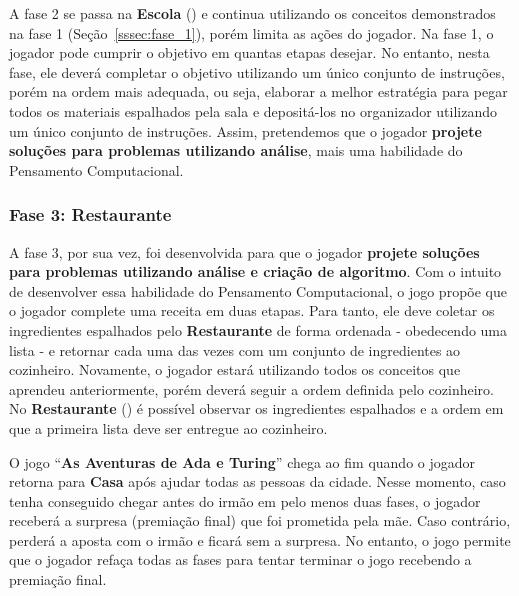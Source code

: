 A fase 2 se passa na \textbf{Escola} () e continua utilizando os conceitos demonstrados na fase 1 (Seção~\ref{sssec:fase_1}), porém limita as ações do jogador. Na fase 1, o jogador pode cumprir o objetivo em quantas etapas desejar. No entanto, nesta fase, ele deverá completar o objetivo utilizando um único conjunto de instruções, porém na ordem mais adequada, ou seja, elaborar a melhor estratégia para pegar todos os materiais espalhados pela sala e depositá-los no organizador utilizando um único conjunto de instruções. Assim, pretendemos que o jogador \textbf{projete soluções para problemas utilizando análise}, mais uma habilidade do Pensamento Computacional.


\subsubsection{Fase 3: Restaurante} \label{sssec:fase_3}

A fase 3, por sua vez, foi desenvolvida para que o jogador \textbf{projete soluções para problemas utilizando análise e criação de algoritmo}. Com o intuito de desenvolver essa habilidade do Pensamento Computacional, o jogo propõe que o jogador complete uma receita em duas etapas. Para tanto, ele deve coletar os ingredientes espalhados pelo \textbf{Restaurante} de forma ordenada - obedecendo uma lista - e retornar cada uma das vezes com um conjunto de ingredientes ao cozinheiro. Novamente, o jogador estará utilizando todos os conceitos que aprendeu anteriormente, porém deverá seguir a ordem definida pelo cozinheiro. No \textbf{Restaurante} () é possível observar os ingredientes espalhados e a ordem em que a primeira lista deve ser entregue ao cozinheiro.


O jogo “\textbf{As Aventuras de Ada e Turing}” chega ao fim quando o jogador retorna para \textbf{Casa} após ajudar todas as pessoas da cidade. Nesse momento, caso tenha conseguido chegar antes do irmão em pelo menos duas fases, o jogador receberá a surpresa (premiação final) que foi prometida pela mãe. Caso contrário, perderá a aposta com o irmão e ficará sem a surpresa. No entanto, o jogo permite que o jogador refaça todas as fases para tentar terminar o jogo recebendo a premiação final. 
